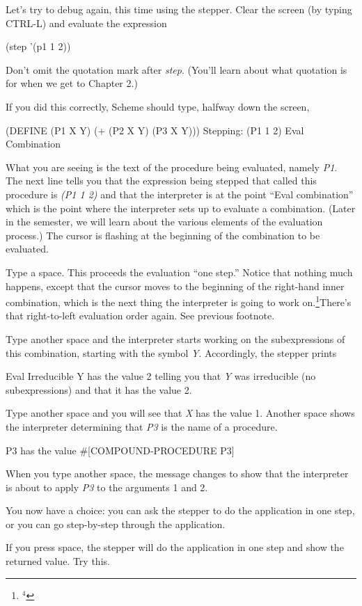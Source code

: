 Let's try to debug again, this time using the stepper.  Clear the
screen (by typing CTRL-L) and evaluate the expression

\beginlisp
(step '(p1 1 2))
\endlisp

Don't omit the quotation mark after {\it step}.   (You'll learn
about what quotation is for when we get to Chapter 2.)

If you did this correctly, Scheme should type, halfway down the screen,
\beginlisp

(DEFINE (P1 X Y) (+ (P2 X Y) (P3 X Y)))
Stepping: (P1 1 2) Eval Combination
\endlisp

What you are seeing is the text of the procedure being evaluated,
namely {\it P1}.  The next line tells you that the expression being
stepped that called this procedure is {\it (P1 1 2)} and that the
interpreter is at the point ``Eval combination'' which is the
point where the interpreter sets up to evaluate a
combination.  (Later in the semester, we will learn about the
various elements of the evaluation process.)  The cursor is
flashing at the beginning of the combination to be evaluated.

Type a space.  This proceeds the evaluation ``one step.''  Notice
that nothing much happens, except that the cursor moves to the
beginning of the right-hand inner combination, which is the next
thing the interpreter is going to work on.\footnote{$^4$}{There's that right-to-left
evaluation order again.  See previous footnote.}

Type another space and the interpreter starts working on the
subexpressions of this combination, starting with the symbol {\it Y}.
Accordingly, the stepper prints
\beginlisp

Eval Irreducible
Y has the value
2
\endlisp
telling you that {\it Y} was irreducible (no subexpressions) and
that it has the value 2.

Type another space and you will see that {\it X} has the value 1.
Another space shows the interpreter determining that {\it P3} is the
name of a procedure.
\beginlisp

P3 has the value
\#[COMPOUND-PROCEDURE P3]
\endlisp

When you type another space, the message changes to show that the
interpreter is about to apply {\it P3} to the arguments 1 and 2.

You now have a choice: you can ask the stepper to do the
application in one step, or you can go step-by-step through the
application.

If you press space, the stepper will do the application in one step and
show the returned value.  Try this.

